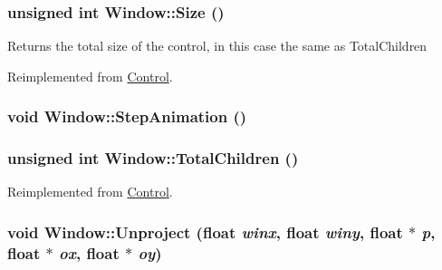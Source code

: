 \hypertarget{class_window_7b5200a4b20ba5a0bafc43ec1207125b}{
\subsubsection[{Size}]{\setlength{\rightskip}{0pt plus 5cm}unsigned int Window::Size ()}}
\label{class_window_7b5200a4b20ba5a0bafc43ec1207125b}


Returns the total size of the control, in this case the same as TotalChildren 

Reimplemented from \hyperlink{class_control_b71295cb3f212dcc92672028155ffb7d}{Control}.\hypertarget{class_window_d5b6265475488a93e6a06c890d006367}{
\subsubsection[{StepAnimation}]{\setlength{\rightskip}{0pt plus 5cm}void Window::StepAnimation ()}}
\label{class_window_d5b6265475488a93e6a06c890d006367}


\hypertarget{class_window_16719560d4f63b07aa4c554bfb1c9cdd}{
\subsubsection[{TotalChildren}]{\setlength{\rightskip}{0pt plus 5cm}unsigned int Window::TotalChildren ()}}
\label{class_window_16719560d4f63b07aa4c554bfb1c9cdd}




Reimplemented from \hyperlink{class_control_ed5bd5da33b1e7007877a777c2c0eddb}{Control}.\hypertarget{class_window_80173b6c9b3b856ee9f905f2ddcf51e6}{
\subsubsection[{Unproject}]{\setlength{\rightskip}{0pt plus 5cm}void Window::Unproject (float {\em winx}, \/  float {\em winy}, \/  float $\ast$ {\em p}, \/  float $\ast$ {\em ox}, \/  float $\ast$ {\em oy})}}
\label{class_window_80173b6c9b3b856ee9f905f2ddcf51e6}


